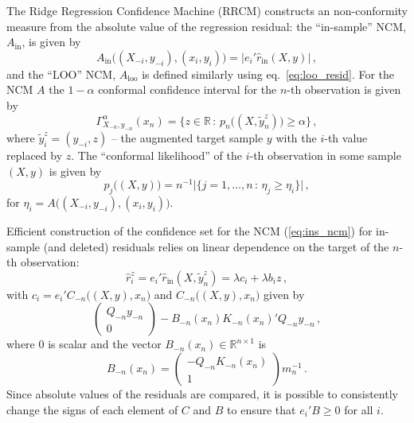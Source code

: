 \documentclass[conference]{IEEEtran}
\newcommand{\Real}{\mathbb{R}}
\begin{document}
The Ridge Regression Confidence Machine (RRCM) constructs an non-conformity measure
from the absolute value of the regression residual: the ``in-sample'' NCM, $A_{\text{in}}$,
is given by
\begin{equation} \label{eq:ins_ncm}
  A_{\text{in}}\bigl((X_{-i}, y_{-i}), (x_i, y_i)\bigr) = |e_i' \hat{r}_{\text{in}}(X, y)| \,,
\end{equation}
and the ``LOO'' NCM, $A_{\text{loo}}$ is defined similarly using eq.~\ref{eq:loo_resid}.
For the NCM $A$ the $1 - \alpha$ conformal confidence interval for the $n$-th observation
is given by
\begin{equation} \label{eq:conf_ci}
  \Gamma_{X_{-n}, y_{-n}}^\alpha(x_n)
    = \bigl\{ z\in \Real \,:\, p_n\bigl((X, \tilde{y}_n^z)\bigr) \geq \alpha \bigr\}
    \,,
\end{equation}
where $\tilde{y}_i^z = (y_{-i}, z)$ -- the augmented target sample $y$ with the
$i$-th value replaced by $z$. The ``conformal likelihood'' of the $i$-th observation
in some sample $(X, y)$ is given by
\begin{equation*}
  p_j\bigl((X, y)\bigr)
    = n^{-1} \bigl\lvert \bigl\{
        j = 1,\ldots, n \, : \,
        \eta_j \geq \eta_i
    \bigr\} \bigr\rvert
    \,,
\end{equation*}
for $\eta_i = A\bigl((X_{-i}, y_{-i}), (x_i, y_i)\bigr)$.

Efficient construction of the confidence set for the NCM (\ref{eq:ins_ncm}) for
in-sample (and deleted) residuals relies on linear dependence on the target of the
$n$-th observation:
\begin{equation} \label{eq:krr_in_resid}
  \hat{r}_i^z
    = e_i' \hat{r}_{\text{in}}(X, \tilde{y}_n^z)
    = \lambda c_i + \lambda b_i z
    \,,
\end{equation}
with $c_i = e_i' C_{-n}\bigl((X, y), x_n\bigr)$ and $C_{-n}\bigl((X, y), x_n\bigr)$
given by
\begin{equation*}
  \begin{pmatrix} Q_{-n} y_{-n} \\ 0 \end{pmatrix}
    - B_{-n}(x_n) K_{-n}(x_n)' Q_{-n} y_{-n}
    \,,
\end{equation*}
where $0$ is scalar and the vector $B_{-n}(x_n)\in\Real^{n\times 1}$ is
\begin{equation} \label{eq:krr_in_resid_B}
  B_{-n}(x_n)
    = \begin{pmatrix} - Q_{-n} K_{-n}(x_n) \\ 1 \end{pmatrix} m_n^{-1}
    \,.
\end{equation}
Since absolute values of the residuals are compared, it is possible to consistently
change the signs of each element of $C$ and $B$ to ensure that $e_i'B\geq 0$ for
all $i$.
\end{document}
